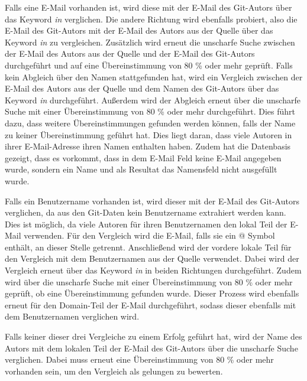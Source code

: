 Falls eine E-Mail vorhanden ist, wird diese mit der E-Mail des Git-Autors über das Keyword \emph{in} verglichen.
Die andere Richtung wird ebenfalls probiert, also die E-Mail des Git-Autors mit der E-Mail des Autors aus der Quelle über das Keyword \emph{in} zu vergleichen.
Zusätzlich wird erneut die unscharfe Suche zwischen der E-Mail des Autors aus der Quelle und der E-Mail des Git-Autors durchgeführt und auf eine Übereinstimmung von 80 \% oder mehr geprüft.
Falls kein Abgleich über den Namen stattgefunden hat, wird ein Vergleich zwischen der E-Mail des Autors aus der Quelle und dem Namen des Git-Autors über das Keyword \emph{in} durchgeführt.
Außerdem wird der Abgleich erneut über die unscharfe Suche mit einer Übereinstimmung von 80 \% oder mehr durchgeführt.
Dies führt dazu, dass weitere Übereinstimmungen gefunden werden können, falls der Name zu keiner Übereinstimmung geführt hat.
Dies liegt daran, dass viele Autoren in ihrer E-Mail-Adresse ihren Namen enthalten haben.
Zudem hat die Datenbasis gezeigt, dass es vorkommt, dass in dem E-Mail Feld keine E-Mail angegeben wurde, sondern ein Name und als Resultat das Namensfeld nicht ausgefüllt wurde.

Falls ein Benutzername vorhanden ist, wird dieser mit der E-Mail des Git-Autors verglichen, da aus den Git-Daten kein Benutzername extrahiert werden kann.
Dies ist möglich, da viele Autoren für ihren Benutzernamen den lokal Teil der E-Mail verwenden.
Für den Vergleich wird die E-Mail, falls sie ein @ Symbol enthält, an dieser Stelle getrennt.
Anschließend wird der vordere lokale Teil für den Vergleich mit dem Benutzernamen aus der Quelle verwendet.
Dabei wird der Vergleich erneut über das Keyword \emph{in} in beiden Richtungen durchgeführt.
Zudem wird über die unscharfe Suche mit einer Übereinstimmung von 80 \% oder mehr geprüft, ob eine Übereinstimmung gefunden wurde.
Dieser Prozess wird ebenfalls erneut für den Domain-Teil der E-Mail durchgeführt, sodass dieser ebenfalls mit dem Benutzernamen verglichen wird.

Falls keiner dieser drei Vergleiche zu einem Erfolg geführt hat, wird der Name des Autors mit dem lokalen Teil der E-Mail des Git-Autors über die unscharfe Suche verglichen.
Dabei muss erneut eine Übereinstimmung von 80 \% oder mehr vorhanden sein, um den Vergleich als gelungen zu bewerten.

